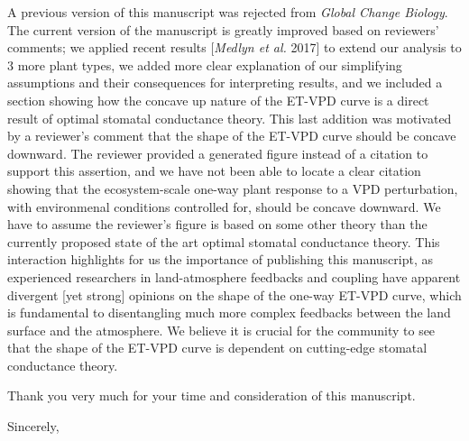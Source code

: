 \documentclass[10pt,stdletter,dateno]{newlfm}
\begin{document}
\begin{newlfm}
  A previous version of this manuscript was rejected from \textit{Global Change Biology}. The current version of the manuscript is greatly improved based on reviewers' comments; we applied recent results [\textit{Medlyn et al.} 2017] to extend our analysis to 3 more plant types, we added more clear explanation of our simplifying assumptions and their consequences for interpreting results, and we included a section showing how the concave up nature of the ET-VPD curve is a direct result of optimal stomatal conductance theory. This last addition was motivated by a reviewer's comment that the shape of the ET-VPD curve should be concave downward. The reviewer provided a generated figure instead of a citation to support this assertion, and we have not been able to locate a clear citation showing that the ecosystem-scale one-way plant response to a VPD perturbation, with environmenal conditions controlled for, should be concave downward. We have to assume the reviewer's figure is based on some other theory than the currently proposed state of the art optimal stomatal conductance theory. This interaction highlights for us the importance of publishing this manuscript, as experienced researchers in land-atmosphere feedbacks and coupling have apparent divergent [yet strong] opinions on the shape of the one-way ET-VPD curve, which is fundamental to disentangling much more complex feedbacks between the land surface and the atmosphere. We believe it is crucial for the community to see that the shape of the ET-VPD curve is dependent on cutting-edge stomatal conductance theory.

  Thank you very much for your time and consideration of this manuscript.
  
\closing{Sincerely,\\
}

\end{newlfm}
\end{document}
